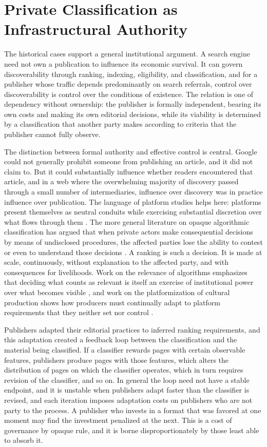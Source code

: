 \documentclass[11pt]{article}
\theoremstyle{remark}
\begin{document}
\section{Private Classification as Infrastructural Authority}

The historical cases support a general institutional argument. A search engine need not own a publication to influence its economic survival. It can govern discoverability through ranking, indexing, eligibility, and classification, and for a publisher whose traffic depends predominantly on search referrals, control over discoverability is control over the conditions of existence. The relation is one of dependency without ownership: the publisher is formally independent, bearing its own costs and making its own editorial decisions, while its viability is determined by a classification that another party makes according to criteria that the publisher cannot fully observe.

The distinction between formal authority and effective control is central. Google could not generally prohibit someone from publishing an article, and it did not claim to. But it could substantially influence whether readers encountered that article, and in a web where the overwhelming majority of discovery passed through a small number of intermediaries, influence over discovery was in practice influence over publication. The language of platform studies helps here: platforms present themselves as neutral conduits while exercising substantial discretion over what flows through them \cite{gillespie2010}. The more general literature on opaque algorithmic classification has argued that when private actors make consequential decisions by means of undisclosed procedures, the affected parties lose the ability to contest or even to understand those decisions \cite{pasquale2015}. A ranking is such a decision. It is made at scale, continuously, without explanation to the affected party, and with consequences for livelihoods. Work on the relevance of algorithms emphasizes that deciding what counts as relevant is itself an exercise of institutional power over what becomes visible \cite{gillespie2014}, and work on the platformization of cultural production shows how producers must continually adapt to platform requirements that they neither set nor control \cite{nieborg2018}.

Publishers adapted their editorial practices to inferred ranking requirements, and this adaptation created a feedback loop between the classification and the material being classified. If a classifier rewards pages with certain observable features, publishers produce pages with those features, which alters the distribution of pages on which the classifier operates, which in turn requires revision of the classifier, and so on. In general the loop need not have a stable endpoint, and it is unstable when publishers adapt faster than the classifier is revised, and each iteration imposes adaptation costs on publishers who are not party to the process. A publisher who invests in a format that was favored at one moment may find the investment penalized at the next. This is a cost of governance by opaque rule, and it is borne disproportionately by those least able to absorb it.
\end{document}
